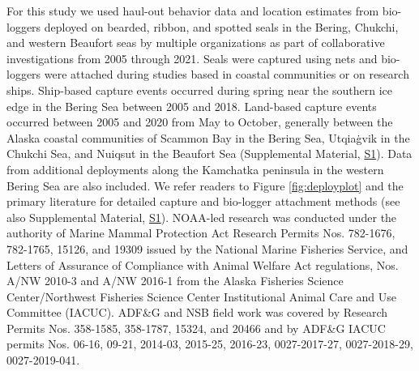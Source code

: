 \documentclass[fleqn,10pt,lineno]{wlpeerj} %
\begin{document}
For this study we used haul-out behavior data and location estimates from
bio-loggers deployed on bearded, ribbon, and spotted seals in the Bering,
Chukchi, and western Beaufort seas by multiple organizations as part of
collaborative investigations from 2005 through 2021. Seals were captured using
nets and bio-loggers were attached during studies based in coastal communities
or on research ships. Ship-based capture events occurred during spring near the
southern ice edge in the Bering Sea between 2005 and 2018. Land-based capture
events occurred between 2005 and 2020 from May to October, generally between the
Alaska coastal communities of Scammon Bay in the Bering Sea, Utqiaġvik in the
Chukchi Sea, and Nuiqsut in the Beaufort Sea (Supplemental Material, \hyperref[s1]{S1}).
Data from additional deployments along the Kamchatka peninsula in the western
Bering Sea are also included. We refer readers to Figure \ref{fig:deployplot}
and the primary literature for detailed capture and bio-logger attachment
methods (see also Supplemental Material, \hyperref[s1]{S1}). NOAA-led research was
conducted under the authority of Marine Mammal Protection Act Research Permits
Nos. 782-1676, 782-1765, 15126, and 19309 issued by the National Marine
Fisheries Service, and Letters of Assurance of Compliance with Animal Welfare
Act regulations, Nos. A/NW 2010-3 and A/NW 2016-1 from the Alaska Fisheries
Science Center/Northwest Fisheries Science Center Institutional Animal Care and
Use Committee (IACUC). ADF\&G and NSB field work was covered by Research Permits
Nos. 358-1585, 358-1787, 15324, and 20466 and by ADF\&G IACUC permits Nos. 06-16,
09-21, 2014-03, 2015-25, 2016-23, 0027-2017-27, 0027-2018-29, 0027-2019-041.
\end{document}
